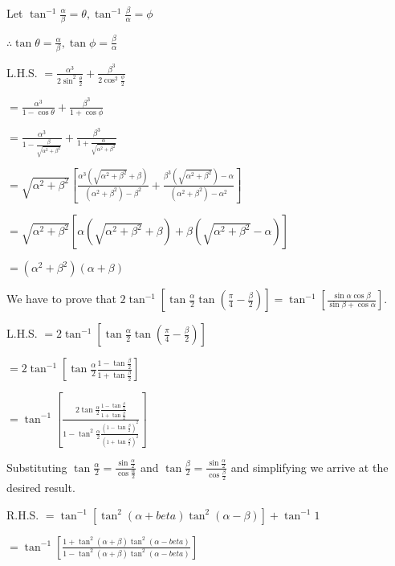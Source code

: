 \item Let $\tan^{-1}\frac{\alpha}{\beta} = \theta, \tan^{-1}\frac{\beta}{\alpha} = \phi$

  $\therefore \tan\theta = \frac{\alpha}{\beta}, \tan\phi = \frac{\beta}{\alpha}$

  L.H.S. $= \frac{\alpha^3}{2\sin^2\frac{\theta}{2}} + \frac{\beta^3}{2\cos^2\frac{\phi}{2}}$

  $= \frac{\alpha^3}{1 - \cos\theta} + \frac{\beta^3}{1 + \cos\phi}$

  $= \frac{\alpha^3}{1 - \frac{\beta}{\sqrt{\alpha^2 + \beta^2}}} + \frac{\beta^3}{1 + \frac{\alpha}{\sqrt{\alpha^2 +
        \beta^2}}}$

  $= \sqrt{\alpha^2 + \beta^2}\left[\frac{\alpha^3(\sqrt{\alpha^2 + \beta^2}+ \beta)}{(\alpha^2 + \beta^2) - \beta^2} +
    \frac{\beta^3(\sqrt{\alpha^2 + \beta^2}) - \alpha}{(\alpha^2 + \beta^2) - \alpha^2}\right]$

  $= \sqrt{\alpha^2 + \beta^2}[\alpha(\sqrt{\alpha^2 + \beta^2} + \beta) + \beta(\sqrt{\alpha^2 + \beta^2} - \alpha)]$

  $= (\alpha^2 + \beta^2)(\alpha + \beta)$

\item We have to prove that $2\tan^{-1}\left[\tan\frac{\alpha}{2}\tan\left(\frac{\pi}{4} - \frac{\beta}{2}\right)\right] =
  \tan^{-1}\left[\frac{\sin\alpha\cos\beta}{\sin\beta + \cos\alpha}\right].$

  L.H.S. $= 2\tan^{-1}\left[\tan\frac{\alpha}{2}\tan\left(\frac{\pi}{4} - \frac{\beta}{2}\right)\right]$

  $= 2\tan^{-1}\left[\tan\frac{\alpha}{2}\frac{1 - \tan\frac{\beta}{2}}{1 + \tan\frac{\beta}{2}}\right]$

  $= \tan^{-1}\left[\frac{2\tan\frac{\alpha}{2}\frac{1 - \tan\frac{\beta}{2}}{1 + \tan\frac{\beta}{2}}}{1 -
      \tan^2\frac{\alpha}{2}\frac{\left(1 - \tan\frac{\beta}{2}\right)^2}{\left(1 + \tan\frac{\beta}{2}\right)^2}}\right]$

  Substituting $\tan\frac{\alpha}{2} = \frac{\sin\frac{\alpha}{2}}{\cos\frac{\alpha}{2}}$ and $\tan\frac{\beta}{2} =
  \frac{\sin\frac{\alpha}{2}}{\cos\frac{\beta}{2}}$ and simplifying we arrive at the desired result.

\item R.H.S. $= \tan^{-1}[\tan^2(\alpha + beta)\tan^2(\alpha - \beta)] + \tan^{-1}1$

  $= \tan^{-1}\left[\frac{1 + \tan^2(\alpha + \beta)\tan^{2}(\alpha - beta)}{1 - \tan^2(\alpha + \beta)\tan^{2}(\alpha -
    beta)}\right]$

